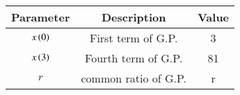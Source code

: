 \begin{tabular}{|c|c|c|}
    \hline
    \textbf{Parameter} & \textbf{Description} & \textbf{Value} \\
    \hline
    $x\left(0\right)$ & First term of G.P. & 3 \\
    \hline
    $x\left(3\right)$ & Fourth term of G.P. & 81 \\
    \hline
    $r$ & common ratio of G.P. & r \\
    \hline
\end{tabular}


